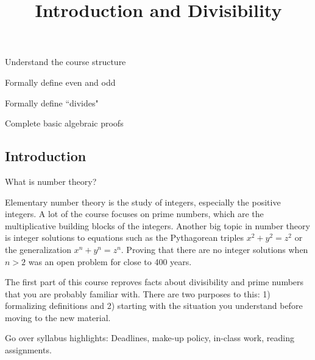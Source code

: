 \documentclass{../ximera}
\title{ Introduction and Divisibility}
\begin{document}
\begin{abstract}
\end{abstract}
\maketitle


\begin{obj}
  \item Understand the course structure
  \item Formally define even and odd
  \item Formally define ``divides"
  \item Complete basic algebraic proofs
\end{obj}

\subsection{Introduction }%

What is number theory?

Elementary number theory is the study of integers, especially the positive integers. A lot of the course focuses on prime numbers, which are the multiplicative building blocks of the integers. Another big topic in number theory is integer solutions to equations such as the Pythagorean triples $x^2+y^2=z^2$ or the generalization $x^n+y^n=z^n$. Proving that there are no integer solutions when $n>2$ was an open problem for close to 400 years.

The first part of this course reproves facts about divisibility and prime numbers that you are probably familiar with. There are two purposes to this: 1) formalizing definitions and 2) starting with the situation you understand before moving to the new material.

Go over syllabus highlights: Deadlines, make-up policy, in-class work, reading assignments.


\end{document}
